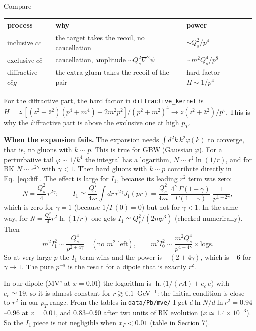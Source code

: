 \documentclass[12pt]{article}
\begin{document}
Compare:
\begin{center}
\begin{tabular}{lll}
\toprule
process & why & power \\
\midrule
inclusive $c\bar c$ & the target takes the recoil, no cancellation & $\sim Q_s^2/p^4$ \\
exclusive $c\bar c$ & cancellation, amplitude $\sim Q_s^2\nabla^2\psi$ & $\sim m^2Q_s^4/p^8$ \\
diffractive $c\bar c g$ & the extra gluon takes the recoil of the pair & hard factor $H\sim 1/p^4$ \\
\bottomrule
\end{tabular}
\end{center}
For the diffractive part, the hard factor in \texttt{diffractive\_kernel} is
$H = z\,[(z^2+\bar z^2)(p^4+m^4)+2m^2p^2]/(p^2+m^2)^4\to z(z^2+\bar z^2)/p^4$. This is why the
diffractive part is above the exclusive one at high $p_T$.

\textbf{When the expansion fails.} The expansion needs $\int d^2k\,k^2\varphi(k)$ to converge, that
is, no gluons with $k\sim p$. This is true for GBW (Gaussian $\varphi$). For a perturbative tail
$\varphi\sim 1/k^4$ the integral has a logarithm, $N\sim r^2\ln(1/r)$, and for BK
$N\sim r^{2\gamma}$ with $\gamma<1$. Then hard gluons with $k\sim p$ contribute directly in
Eq.~\eqref{eq:diff}. The effect is large for $I_1$, because its leading $r^2$ term was zero:
\begin{equation}
  N=\frac{Q_s^2}{4}\,r^{2\gamma}:\qquad I_1\simeq\frac{Q_s^2}{4m}\int dr\,r^{2\gamma}J_1(pr)
  = \frac{Q_s^2}{4m}\;\frac{4^{\gamma}\,\Gamma(1+\gamma)}{\Gamma(1-\gamma)}\;\frac{1}{p^{1+2\gamma}} ,
\end{equation}
which is zero for $\gamma=1$ (because $1/\Gamma(0)=0$) but not for $\gamma<1$. In the same way, for
$N=\tfrac{Q_s^2}{4}r^2\ln(1/r)$ one gets $I_1\simeq Q_s^2/(2mp^3)$ (checked numerically). Then
\begin{equation}
  m^2 I_1^2 \sim \frac{Q_s^4}{p^{2+4\gamma}}\quad(\text{no } m^2 \text{ left}),\qquad
  m^2 I_0^2\sim \frac{m^2Q_s^4}{p^{4+4\gamma}}\times\text{logs}.
\end{equation}
So at very large $p$ the $I_1$ term wins and the power is $-(2+4\gamma)$, which is $-6$ for
$\gamma\to1$. The pure $p^{-8}$ is the result for a dipole that is exactly $r^2$.

In our dipole (MV$^e$ at $x=0.01$) the logarithm is $\ln\!\big(1/(r\Lambda)+e_c\,e\big)$ with
$e_c\simeq 19$, so it is almost constant for $r\gtrsim 0.1$~GeV$^{-1}$: the initial condition is
close to $r^2$ in our $p_T$ range. From the tables in \texttt{data/Pb/mve/} I get
$d\ln N/d\ln r^2 = 0.94$--$0.96$ at $x=0.01$, and $0.83$--$0.90$ after two units of BK evolution
($x\simeq 1.4\times10^{-3}$). So the $I_1$ piece is not negligible when $x_P<0.01$ (table in Section 7).
\end{document}
